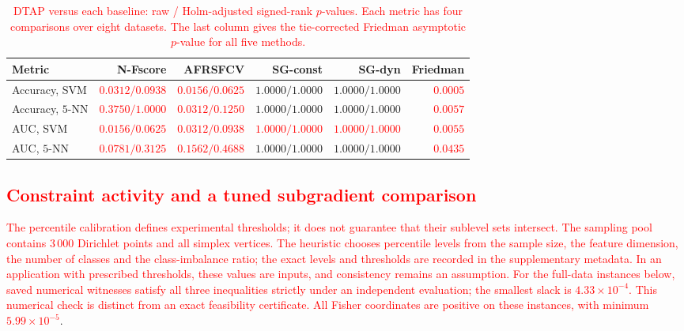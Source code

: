 \documentclass[]{interact}
\theoremstyle{plain}
\theoremstyle{definition}
\theoremstyle{remark}
\begin{document}
\begin{table}[htbp]
\centering\footnotesize\setlength{\tabcolsep}{4pt}
\caption{\textcolor{red}{DTAP versus each baseline: raw / Holm-adjusted signed-rank $p$-values. Each metric has four comparisons over eight datasets. The last column gives the tie-corrected Friedman asymptotic $p$-value for all five methods.}}\label{tab:wilcoxon}
\begin{tabular}{lrrrrr}
\toprule
Metric & N-Fscore & AFRSFCV & SG-const & SG-dyn & Friedman \\
\midrule
Accuracy, SVM & \leavevmode\textcolor{red}{$0.0312/0.0938$} & \leavevmode\textcolor{red}{$0.0156/0.0625$} & $1.0000/1.0000$ & $1.0000/1.0000$ & \leavevmode\textcolor{red}{$0.0005$} \\
Accuracy, $5$-NN & \leavevmode\textcolor{red}{$0.3750/1.0000$} & \leavevmode\textcolor{red}{$0.0312/0.1250$} & $1.0000/1.0000$ & $1.0000/1.0000$ & \leavevmode\textcolor{red}{$0.0057$} \\
AUC, SVM & \leavevmode\textcolor{red}{$0.0156/0.0625$} & \leavevmode\textcolor{red}{$0.0312/0.0938$} & \leavevmode\textcolor{red}{$1.0000/1.0000$} & \leavevmode\textcolor{red}{$1.0000/1.0000$} & \leavevmode\textcolor{red}{$0.0055$} \\
AUC, $5$-NN & \leavevmode\textcolor{red}{$0.0781/0.3125$} & \leavevmode\textcolor{red}{$0.1562/0.4688$} & $1.0000/1.0000$ & $1.0000/1.0000$ & \leavevmode\textcolor{red}{$0.0435$} \\
\bottomrule
\end{tabular}

\end{table}

\subsection{\textcolor{red}{Constraint activity and a tuned subgradient comparison}}
\label{ssec:feasibility-audit}

\leavevmode\textcolor{red}{The percentile calibration defines experimental thresholds; it does not
guarantee that their sublevel sets intersect. The sampling pool contains
$3\,000$ Dirichlet points and all simplex vertices. The heuristic chooses
percentile levels from the sample size, the feature dimension, the number of
classes and the class-imbalance ratio; the exact
levels and thresholds are recorded in the supplementary metadata. In an
application with prescribed thresholds, these values are inputs, and consistency remains an
assumption. For the full-data instances below, saved numerical witnesses
satisfy all three inequalities strictly under an independent evaluation;
the smallest slack is $4.33\times10^{-4}$. This numerical check is distinct
from an exact feasibility certificate. All Fisher coordinates are positive
on these instances, with minimum $5.99\times10^{-5}$}.
\end{document}
